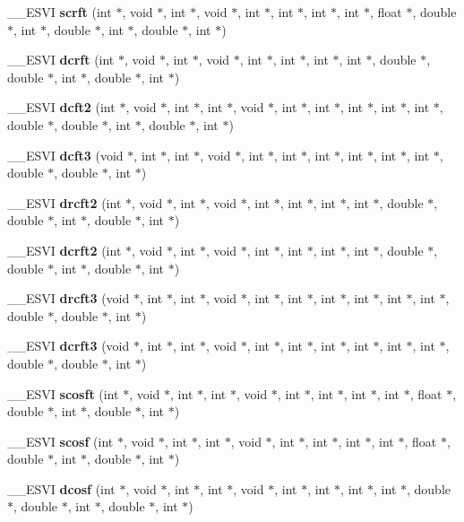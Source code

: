\begin{CompactItemize}
\item 
\_\-\_\-ESVI {\bf scrft} (int $\ast$, void $\ast$, int $\ast$, void $\ast$, int $\ast$, int $\ast$, int $\ast$, int $\ast$, float $\ast$, double $\ast$, int $\ast$, double $\ast$, int $\ast$, double $\ast$, int $\ast$)
\item 
\_\-\_\-ESVI {\bf dcrft} (int $\ast$, void $\ast$, int $\ast$, void $\ast$, int $\ast$, int $\ast$, int $\ast$, int $\ast$, double $\ast$, double $\ast$, int $\ast$, double $\ast$, int $\ast$)
\item 
\_\-\_\-ESVI {\bf dcft2} (int $\ast$, void $\ast$, int $\ast$, int $\ast$, void $\ast$, int $\ast$, int $\ast$, int $\ast$, int $\ast$, int $\ast$, double $\ast$, double $\ast$, int $\ast$, double $\ast$, int $\ast$)
\item 
\_\-\_\-ESVI {\bf dcft3} (void $\ast$, int $\ast$, int $\ast$, void $\ast$, int $\ast$, int $\ast$, int $\ast$, int $\ast$, int $\ast$, int $\ast$, double $\ast$, double $\ast$, int $\ast$)
\item 
\_\-\_\-ESVI {\bf drcft2} (int $\ast$, void $\ast$, int $\ast$, void $\ast$, int $\ast$, int $\ast$, int $\ast$, int $\ast$, double $\ast$, double $\ast$, int $\ast$, double $\ast$, int $\ast$)
\item 
\_\-\_\-ESVI {\bf dcrft2} (int $\ast$, void $\ast$, int $\ast$, void $\ast$, int $\ast$, int $\ast$, int $\ast$, int $\ast$, double $\ast$, double $\ast$, int $\ast$, double $\ast$, int $\ast$)
\item 
\_\-\_\-ESVI {\bf drcft3} (void $\ast$, int $\ast$, int $\ast$, void $\ast$, int $\ast$, int $\ast$, int $\ast$, int $\ast$, int $\ast$, int $\ast$, double $\ast$, double $\ast$, int $\ast$)
\item 
\_\-\_\-ESVI {\bf dcrft3} (void $\ast$, int $\ast$, int $\ast$, void $\ast$, int $\ast$, int $\ast$, int $\ast$, int $\ast$, int $\ast$, int $\ast$, double $\ast$, double $\ast$, int $\ast$)
\item 
\_\-\_\-ESVI {\bf scosft} (int $\ast$, void $\ast$, int $\ast$, int $\ast$, void $\ast$, int $\ast$, int $\ast$, int $\ast$, int $\ast$, float $\ast$, double $\ast$, int $\ast$, double $\ast$, int $\ast$)
\item 
\_\-\_\-ESVI {\bf scosf} (int $\ast$, void $\ast$, int $\ast$, int $\ast$, void $\ast$, int $\ast$, int $\ast$, int $\ast$, int $\ast$, float $\ast$, double $\ast$, int $\ast$, double $\ast$, int $\ast$)
\item 
\_\-\_\-ESVI {\bf dcosf} (int $\ast$, void $\ast$, int $\ast$, int $\ast$, void $\ast$, int $\ast$, int $\ast$, int $\ast$, int $\ast$, double $\ast$, double $\ast$, int $\ast$, double $\ast$, int $\ast$)

\end{CompactItemize}
